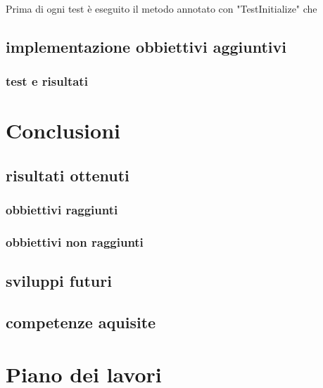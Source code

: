 \documentclass[twoside]{supsistudent}
\begin{document}
Prima di ogni test è eseguito il metodo annotato con "TestInitialize" che 

\section{implementazione obbiettivi aggiuntivi}%
\subsection{test e risultati}%

\chapter{Conclusioni}
\section{risultati ottenuti}
\subsection{obbiettivi raggiunti}
\subsection{obbiettivi non raggiunti}
\section{sviluppi futuri}%
\section{competenze aquisite}%

\chapter{Piano dei lavori}%










\end{document}

